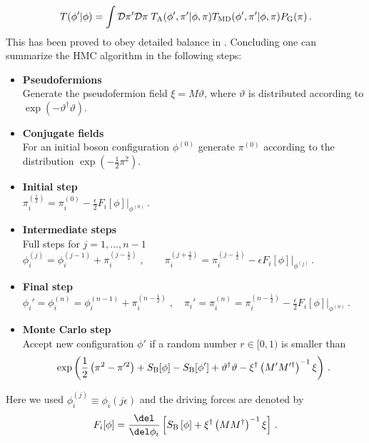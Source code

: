 %
%
\begin{equation}
T(\phi'\vert\phi) = \int \mathcal{D}\pi' \mathcal{D}\pi\; T_{\rm A}(\phi',\pi' \vert \phi,\pi) T_{\rm MD}(\phi',\pi' \vert \phi,\pi) P_{\rm G}(\pi)\, .
\end{equation}
%
%
This has been proved to obey detailed balance in \cite{hmc}. Concluding one can summarize the HMC algorithm in the following steps:
%
%
\begin{itemize}
\item \textbf{Pseudofermions}\\
Generate the pseudofermion field $\xi = M\vartheta$, where $\vartheta$ is distributed according to $\exp(-\vartheta^{\dagger}\vartheta)$.
%
%
\item \textbf{Conjugate fields}\\
For an initial boson configuration $\phi^{(0)}$ generate $\pi^{(0)}$ according to the  distribution $\exp(-\tfrac{1}{2}\pi^{2})$.
%
%
\item \textbf{Initial step}\\
$\pi_{i}^{(\frac{1}{2})} = \pi_{i}^{(0)} - \frac{\epsilon}{2}F_{i}\left[\phi\right] \Big\vert_{\phi^{(0)}} \,.$
%
%
\item \textbf{Intermediate steps}\\
Full steps for $j=1,\ldots,n-1$\\[0.2cm]
$\phi_{i}^{(j)} = \phi_{i}^{(j-1)} + \pi_{i}^{(j-\frac{1}{2})}\;, \qquad
\pi_{i}^{(j+\frac{1}{2})} = \pi_{i}^{(j-\frac{1}{2})} -\epsilon  F_{i}\left[\phi\right] \Big\vert_{\phi^{(j)}}\, .
$
%
%
\item \textbf{Final step}\\
$\phi_{i}'=\phi_{i}^{(n)}= \phi_{i}^{(n-1)} + \pi_{i}^{(n-\frac{1}{2})}\;, \quad
\pi_{i}' = \pi_{i}^{(n)} = \pi_{i}^{(n-\frac{1}{2})} - \frac{\epsilon}{2}  F_{i}\left[\phi\right] \Big\vert_{\phi^{(n)}}\,.$
%
%
\item \textbf{Monte Carlo step}\\
Accept new configuration $\phi'$ if a random number $r \in [0,1)$ is smaller than
\[\exp\left(\frac{1}{2}\left(\pi^{2}-\pi'^{2}\right) + S_{\rm B}[\phi]-S_{\rm B}[\phi'] +\vartheta^{\dagger}\vartheta - \xi^{\dagger}\left(M'M'^{\dagger}\right)^{-1} \xi \right)\, .  \]
\end{itemize}
%
%
Here we used $\phi_{i}^{(j)}\equiv \phi_{i}(j\epsilon)$ and the driving forces are denoted by
\begin{equation}
F_{i}[\phi] = \frac{\del }{\del \phi_{i}}\left[ S_{\rm B}\left[\phi\right] + \xi^{\dagger}\left(MM^{\dagger}\right)^{-1}\xi \right]\,.
\end{equation}
%
%
%
%
%
%
%
%
